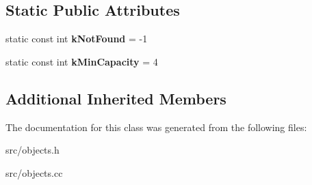 \subsection*{Static Public Attributes}
\begin{DoxyCompactItemize}
\item 
\hypertarget{classv8_1_1internal_1_1_ordered_hash_table_a67651d10adaf728fab554b061ce94afa}{}static const int {\bfseries k\+Not\+Found} = -\/1\label{classv8_1_1internal_1_1_ordered_hash_table_a67651d10adaf728fab554b061ce94afa}

\item 
\hypertarget{classv8_1_1internal_1_1_ordered_hash_table_aa45a45fb1d31fefba42cab9dc9881dd8}{}static const int {\bfseries k\+Min\+Capacity} = 4\label{classv8_1_1internal_1_1_ordered_hash_table_aa45a45fb1d31fefba42cab9dc9881dd8}

\end{DoxyCompactItemize}
\subsection*{Additional Inherited Members}


The documentation for this class was generated from the following files\+:\begin{DoxyCompactItemize}
\item 
src/objects.\+h\item 
src/objects.\+cc\end{DoxyCompactItemize}
